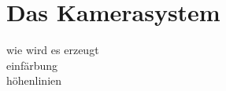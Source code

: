 \section{Das Kamerasystem}
\begin{Spacing}{\mylinespace}

wie wird es erzeugt \\
einfärbung\\
höhenlinien\\


\end{Spacing}
\newpage
\clearpage

